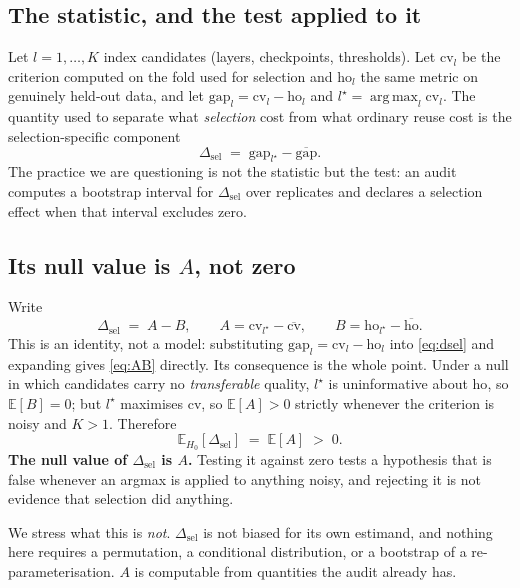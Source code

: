 \documentclass{article}
\begin{document}
\subsection{The statistic, and the test applied to it}

Let $l=1,\dots,K$ index candidates (layers, checkpoints, thresholds). Let
$\text{cv}_l$ be the criterion computed on the fold used for selection and
$\text{ho}_l$ the same metric on genuinely held-out data, and let
$\text{gap}_l=\text{cv}_l-\text{ho}_l$ and
$l^\star=\operatorname*{arg\,max}_l \text{cv}_l$. The quantity used to
separate what \emph{selection} cost from what ordinary reuse cost is the
selection-specific component
\begin{equation}
  \Delta_{\text{sel}} \;=\; \text{gap}_{l^\star}-\overline{\text{gap}} .
  \label{eq:dsel}
\end{equation}
The practice we are questioning is not the statistic but the test: an audit
computes a bootstrap interval for $\Delta_{\text{sel}}$ over replicates and
declares a selection effect when that interval excludes zero.

\subsection{Its null value is $A$, not zero}

Write
\begin{equation}
  \Delta_{\text{sel}} \;=\; A-B,\qquad
  A=\text{cv}_{l^\star}-\overline{\text{cv}},\qquad
  B=\text{ho}_{l^\star}-\overline{\text{ho}} .
  \label{eq:AB}
\end{equation}
This is an identity, not a model: substituting
$\text{gap}_l=\text{cv}_l-\text{ho}_l$ into \eqref{eq:dsel} and expanding
gives \eqref{eq:AB} directly. Its consequence is the whole point. Under a null
in which candidates carry no \emph{transferable} quality, $l^\star$ is
uninformative about $\text{ho}$, so $\mathbb{E}[B]=0$; but $l^\star$ maximises
$\text{cv}$, so $\mathbb{E}[A]>0$ strictly whenever the criterion is noisy and
$K>1$. Therefore
\[
  \mathbb{E}_{H_0}[\Delta_{\text{sel}}] \;=\; \mathbb{E}[A] \;>\; 0 .
\]
\textbf{The null value of $\Delta_{\text{sel}}$ is $A$.} Testing it against
zero tests a hypothesis that is false whenever an argmax is applied to
anything noisy, and rejecting it is not evidence that selection did anything.

We stress what this is \emph{not}. $\Delta_{\text{sel}}$ is not biased for its
own estimand, and nothing here requires a permutation, a conditional
distribution, or a bootstrap of a re-parameterisation. $A$ is computable from
quantities the audit already has.
\end{document}
